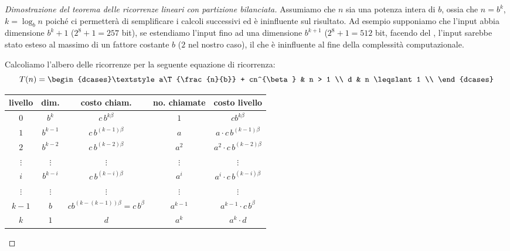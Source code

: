 \begin{proof}[Dimostrazione del teorema delle ricorrenze lineari con partizione bilanciata]
Assumiamo che \(n\) sia una potenza intera di \(b\), ossia che \(n = b^k\), \(k = \log_b n\) poiché ci permetterà di semplificare i calcoli successivi ed è ininfluente sul risultato.
Ad esempio supponiamo che l'input abbia dimensione \(b^k + 1\) (\(2^8 + 1 = 257\) bit), se estendiamo l'input fino ad una dimensione \(b^{k+1}\) (\(2^8+1 = 512\) bit, facendo del , l'input sarebbe stato esteso al massimo di un fattore costante \(b\) (\(2\) nel nostro caso), il che è ininfluente al fine della complessità computazionale.

Calcoliamo l'albero delle ricorrenze per la seguente equazione di ricorrenza:
\[
	T(n) =
	\begin{dcases}\textstyle
		a\T{\frac{n}{b}} + cn^{\beta} & n > 1 \\
		d & n \leqslant 1 \\
	\end{dcases}
\]

\clearpage
\begin{center}
	\begin{tabular}{@{} *{5}{c} @{}}
		\toprule
			livello & dim. & costo chiam. & no. chiamate & costo livello \\
		\midrule
			\(0\) & \(b^k\) & \(c\,b^{k\beta}\) & \(1\) & \(cb^{k\beta}\) \\
		\addlinespace
			\(1\) & \(b^{k-1}\) & \(c\,b^{(k-1)\beta}\) & \(a\)  & \(a \cdot c\, b^{(k-1)\beta}\)\\
		\addlinespace
			\(2\) & \(b^{k-2}\) & \(c\,b^{(k-2)\beta}\) & \(a^2\) & \(a^2 \cdot c\, b^{(k-2)\beta}\)\\
		\addlinespace
			\(\vdots\) & \(\vdots\) & \(\vdots\) & \(\vdots\) & \(\vdots\) \\
		\addlinespace
			\(i\) & \(b^{k-i}\) & \(c\,b^{(k-i)\beta}\) & \(a^i\) & \(a^i \cdot c\, b^{(k-i)\beta}\)\\
		\addlinespace
			\(\vdots\) & \(\vdots\) & \(\vdots\) & \(\vdots\) & \(\vdots\) \\
		\addlinespace
			\(k-1\) & \(b\) & \(c b^{(k-(k-1))\beta} = c\,b^{\beta}\) & \(a^{k-1}\) & \(a^{k-1} \cdot c\, b^{\beta}\) \\
		\addlinespace
			\(k\) & \(1\) & \(d\) & \(a^k\) & \(a^k \cdot d\) \\
		\bottomrule
	\end{tabular}
\end{center}


\end{proof}
